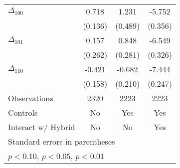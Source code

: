 {\begin{tabular}{l*{3}{c}}
$\Delta_{100}$&    0.718\sym{***}&    1.231\sym{**} &   -5.752\sym{***}\\
          &  (0.136)         &  (0.489)         &  (0.356)         \\
$\Delta_{101}$&    0.157         &    0.848\sym{***}&   -6.549\sym{***}\\
          &  (0.262)         &  (0.281)         &  (0.326)         \\
$\Delta_{110}$&   -0.421\sym{***}&   -0.682\sym{***}&   -7.444\sym{***}\\
          &  (0.158)         &  (0.210)         &  (0.247)         \\
\hline
Observations&     2320         &     2223         &     2223         \\
Controls  &       No         &      Yes         &      Yes         \\
Interact w/ Hybrid&       No         &       No         &      Yes         \\
\hline\hline
\multicolumn{4}{l}{\footnotesize Standard errors in parentheses}\\
\multicolumn{4}{l}{\footnotesize \sym{*} \(p<0.10\), \sym{**} \(p<0.05\), \sym{***} \(p<0.01\)}\\
\end{tabular}
}
